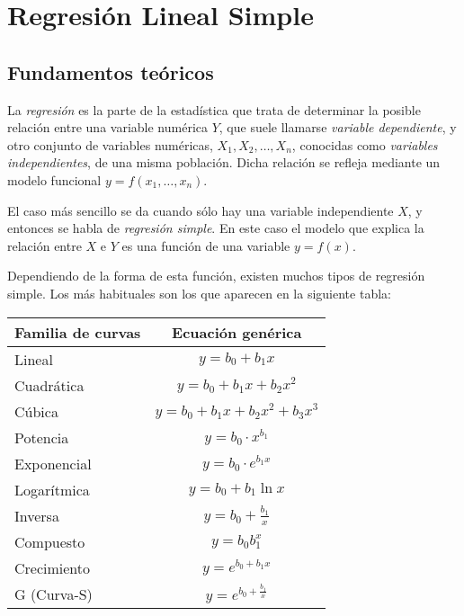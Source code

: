 
\chapter{Regresión Lineal Simple}

\section{Fundamentos teóricos}
La \emph{regresión} es la parte de la estadística que trata de determinar la
posible relación entre una variable numérica $Y$, que suele llamarse
\emph{variable dependiente}, y otro conjunto de variables numéricas, $X_1,
X_2,\ldots,X_n$, conocidas como \emph{variables independientes}, de una misma
población. Dicha relación se refleja mediante un modelo funcional
$y=f(x_1,\ldots,x_n)$.

El caso más sencillo se da cuando sólo hay una variable independiente $X$, y
entonces se habla de \emph{regresión simple}. En este caso el modelo que
explica la relación entre $X$ e $Y$ es una función de una variable $y=f(x)$.

Dependiendo de la forma de esta función, existen muchos tipos de regresión
simple. Los más habituales son los que aparecen en la siguiente tabla:
\begin{center}
\begin{tabular}{|l|c|}
\hline
 Familia de curvas       &     Ecuación genérica      \\
\hline\hline
 Lineal                  &          $y=b_0+b_1x$          \\
\hline
 Cuadrática              &       $y=b_0+b_1x+b_2x^2$        \\
\hline
 Cúbica & $y=b_0+b_1x+b_2x^2+b_3x^3$ \\
\hline
 Potencia               &       $y=b_0\cdot x^{b_1}$       \\
\hline
 Exponencial             &     $y=b_0\cdot e^{b_1x}$      \\
\hline
 Logarítmica             &       $y=b_0+b_1\ln x$        \\
\hline
Inversa             &       $y=b_0+\frac{b_1}{x}$        \\
\hline
Compuesto              &       $y=b_0b_1^x$        \\
\hline
Crecimiento             &       $y= e^{b_0 + b_1x}$        \\
\hline
G (Curva-S)             &       $y= e^{b_0 +\frac{b_1}{x} }$        \\
\hline
\end{tabular}
\end{center}

